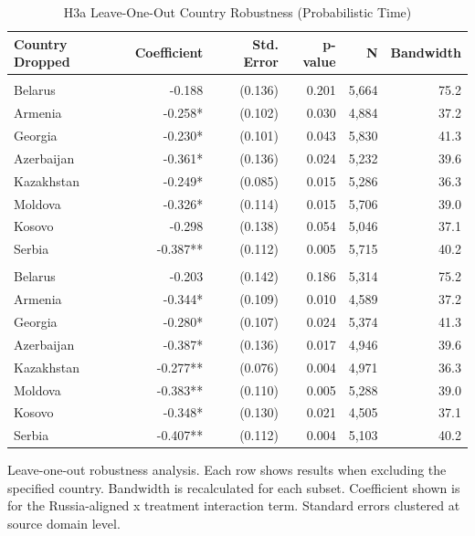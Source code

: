 \begin{table}[t]
\caption{\label{tab:s10loo}H3a Leave-One-Out Country Robustness (Probabilistic Time)}
\fontsize{12.0pt}{14.0pt}\selectfont
\begin{tabular*}{\linewidth}{@{\extracolsep{\fill}}lrrrrr}
\toprule
Country Dropped & Coefficient & Std. Error & p-value & N & Bandwidth \\ 
\midrule\addlinespace[2.5pt]
\multicolumn{6}{l}{Standard Model} \\[2.5pt] 
\midrule\addlinespace[2.5pt]
Belarus & -0.188 & (0.136) & 0.201 & 5,664 & 75.2 \\ 
Armenia & -0.258* & (0.102) & 0.030 & 4,884 & 37.2 \\ 
Georgia & -0.230* & (0.101) & 0.043 & 5,830 & 41.3 \\ 
Azerbaijan & -0.361* & (0.136) & 0.024 & 5,232 & 39.6 \\ 
Kazakhstan & -0.249* & (0.085) & 0.015 & 5,286 & 36.3 \\ 
Moldova & -0.326* & (0.114) & 0.015 & 5,706 & 39.0 \\ 
Kosovo & -0.298 & (0.138) & 0.054 & 5,046 & 37.1 \\ 
Serbia & -0.387** & (0.112) & 0.005 & 5,715 & 40.2 \\ 
\midrule\addlinespace[2.5pt]
\multicolumn{6}{l}{Matched Model} \\[2.5pt] 
\midrule\addlinespace[2.5pt]
Belarus & -0.203 & (0.142) & 0.186 & 5,314 & 75.2 \\ 
Armenia & -0.344* & (0.109) & 0.010 & 4,589 & 37.2 \\ 
Georgia & -0.280* & (0.107) & 0.024 & 5,374 & 41.3 \\ 
Azerbaijan & -0.387* & (0.136) & 0.017 & 4,946 & 39.6 \\ 
Kazakhstan & -0.277** & (0.076) & 0.004 & 4,971 & 36.3 \\ 
Moldova & -0.383** & (0.110) & 0.005 & 5,288 & 39.0 \\ 
Kosovo & -0.348* & (0.130) & 0.021 & 4,505 & 37.1 \\ 
Serbia & -0.407** & (0.112) & 0.004 & 5,103 & 40.2 \\ 
\bottomrule
\end{tabular*}
\begin{minipage}{\linewidth}
\vspace{.05em}
Leave-one-out robustness analysis. Each row shows results when excluding the
specified country. Bandwidth is recalculated for each subset. Coefficient
shown is for the Russia-aligned x treatment interaction term. Standard errors
clustered at source domain level.\\
\end{minipage}
\end{table}

